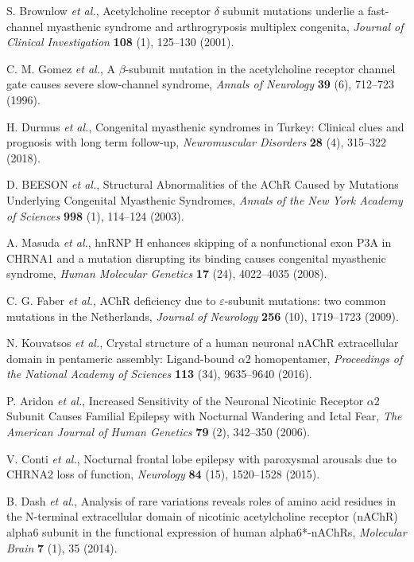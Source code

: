 S. Brownlow {\em et al.}, Acetylcholine receptor $\delta$ subunit mutations underlie a fast-channel myasthenic syndrome and arthrogryposis multiplex congenita, {\em Journal of Clinical Investigation} {\bf 108} (1), 125--130 (2001).

C. M. Gomez {\em et al.}, A $\beta$-subunit mutation in the acetylcholine receptor channel gate causes severe slow-channel syndrome, {\em Annals of Neurology} {\bf 39} (6), 712--723 (1996).

H. Durmus {\em et al.}, Congenital myasthenic syndromes in Turkey: Clinical clues and prognosis with long term follow-up, {\em Neuromuscular Disorders} {\bf 28} (4), 315--322 (2018).

D. BEESON {\em et al.}, Structural Abnormalities of the AChR Caused by Mutations Underlying Congenital Myasthenic Syndromes, {\em Annals of the New York Academy of Sciences} {\bf 998} (1), 114--124 (2003).

A. Masuda {\em et al.}, hnRNP H enhances skipping of a nonfunctional exon P3A in CHRNA1 and a mutation disrupting its binding causes congenital myasthenic syndrome, {\em Human Molecular Genetics} {\bf 17} (24), 4022--4035 (2008).

C. G. Faber {\em et al.}, AChR deficiency due to $\varepsilon$-subunit mutations: two common mutations in the Netherlands, {\em Journal of Neurology} {\bf 256} (10), 1719--1723 (2009).

N. Kouvatsos {\em et al.}, Crystal structure of a human neuronal nAChR extracellular domain in pentameric assembly: Ligand-bound $\alpha$2 homopentamer, {\em Proceedings of the National Academy of Sciences} {\bf 113} (34), 9635--9640 (2016).

P. Aridon {\em et al.}, Increased Sensitivity of the Neuronal Nicotinic Receptor $\alpha$2 Subunit Causes Familial Epilepsy with Nocturnal Wandering and Ictal Fear, {\em The American Journal of Human Genetics} {\bf 79} (2), 342--350 (2006).

V. Conti {\em et al.}, Nocturnal frontal lobe epilepsy with paroxysmal arousals due to CHRNA2 loss of function, {\em Neurology} {\bf 84} (15), 1520--1528 (2015).

B. Dash {\em et al.}, Analysis of rare variations reveals roles of amino acid residues in the N-terminal extracellular domain of nicotinic acetylcholine receptor (nAChR) alpha6 subunit in the functional expression of human alpha6*-nAChRs, {\em Molecular Brain} {\bf 7} (1), 35 (2014).

